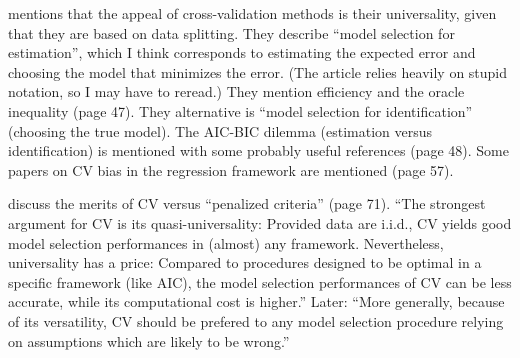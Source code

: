 \textcite{arlot2010survey} mentions that the appeal of cross-validation methods is their universality, given that they are based on data splitting. They describe ``model selection for estimation'', which I think corresponds to estimating the expected error and choosing the model that minimizes the error. (The article relies heavily on stupid notation, so I may have to reread.) They mention efficiency and the oracle inequality (page 47). They alternative is ``model selection for identification'' (choosing the true model). The AIC-BIC dilemma (estimation versus identification) is mentioned with some probably useful references (page 48). Some papers on CV bias in the regression framework are mentioned (page 57).

\textcite{arlot2010survey} discuss the merits of CV versus ``penalized criteria'' (page 71). ``The strongest argument for CV is its quasi-universality: Provided data are i.i.d., CV yields good model selection performances in (almost) any framework. Nevertheless, universality has a price: Compared to procedures designed to be optimal in a specific framework (like AIC), the model selection performances of CV can be less accurate, while its computational cost is higher.'' Later: ``More generally, because of its versatility, CV should be prefered to any model selection procedure relying on assumptions which are likely to be wrong.''

